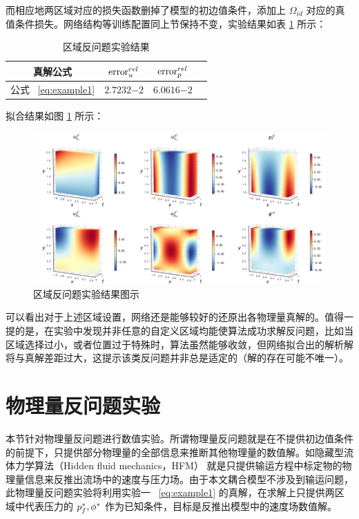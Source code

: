 而相应地两区域对应的损失函数删掉了模型的初边值条件，添加上 $\Omega_{id}$ 对应的真值条件损失。网络结构等训练配置同上节保持不变，实验结果如表 \ref{tab:example_area_inverse} 所示：

\begin{table}[H]
    \centering
    \caption{区域反问题实验结果}
    \begin{tabular}{cccc}
        \toprule
        真解公式 & $\mathrm{error}^{rel}_{u}$ & $\mathrm{error}^{rel}_{p}$ \\
        \midrule
        公式 ~\eqref{eq:example1}  & $\num{2.7232}{-2}$ & $\num{6.0616}{-2}$ \\
        \bottomrule
    \end{tabular}
    \label{tab:example_area_inverse}
\end{table}

拟合结果如图 \ref{fig:example_area_inverse_fitted} 所示：

\begin{figure}[H]
    \centering
    \includegraphics[width=0.75\linewidth]{images/example_area_inverse_fitted.png}
    \caption{ 区域反问题实验结果图示 }
    \label{fig:example_area_inverse_fitted}
\end{figure}

可以看出对于上述区域设置，网络还是能够较好的还原出各物理量真解的。值得一提的是，在实验中发现并非任意的自定义区域均能使算法成功求解反问题，比如当区域选择过小，或者位置过于特殊时，算法虽然能够收敛，但网络拟合出的解析解将与真解差距过大，这提示该类反问题并非总是适定的（解的存在可能不唯一）。

\section{物理量反问题实验}

本节针对物理量反问题进行数值实验。所谓物理量反问题就是在不提供初边值条件的前提下，只提供部分物理量的全部信息来推断其他物理量的数值解。如隐藏型流体力学算法（Hidden fluid mechanics，HFM）\cite{raissi2020hidden} 就是只提供输运方程中标定物的物理量信息来反推出流场中的速度与压力场。由于本文耦合模型不涉及到输运问题，此物理量反问题实验将利用实验一 ~\eqref{eq:example1} 的真解，在求解上只提供两区域中代表压力的 $p_f^*, \phi^*$ 作为已知条件，目标是反推出模型中的速度场数值解。

